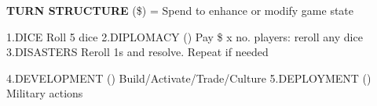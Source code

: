 \begin{flushleft}
  \textbf{TURN STRUCTURE} ({\color{supplemental}\$}) {\color{supplemental} = Spend to enhance or modify game state}
\end{flushleft}
1.DICE {\color{supplemental} Roll 5 dice}
\newline
2.DIPLOMACY ({\color{supplemental}{\$}}) {\color{supplemental} Pay \$ x no. players: reroll any dice}
\newline
3.DISASTERS {\color{supplemental} Reroll 1s and resolve. Repeat if needed}
\newline

\newline
4.DEVELOPMENT ({\color{supplemental}{\$}}) {\color{supplemental} Build/Activate/Trade/Culture}
\newline
5.DEPLOYMENT ({\color{supplemental}{\$}}) {\color{supplemental} Military actions}
\newline
